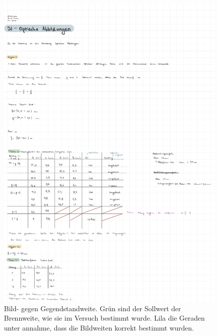 \begin{figure}[h!]
    \centering
    \includegraphics[width=\textwidth, page=7]{Protokolle/31/Chapter/Messprotokoll.pdf}
    \caption{Bild- gegen Gegendstandweite. Grün sind der Sollwert der Brennweite, wie sie im Versuch bestimmt wurde. Lila die Geraden unter annahme, dass die Bildweiten korrekt bestimmt wurden.}
    \label{fig:auswertung_achromat4}
\end{figure}

